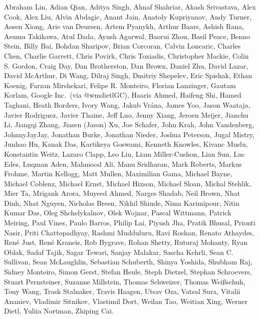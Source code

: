 Abraham Lin,
Adian Qian,
Aditya Singh,
Ahnaf Shahriar,
Akash Srivastava,
Alex Cook,
Alex Liu,
Alvin Abdagic,
Anant Jain,
Anatoly Kupriyanov,
Andy Turner,
Aosen Xiong,
Arie van Deursen,
Artem Pyanykh,
Arthur Baars,
Ashish Rana,
Asumu Takikawa,
Atul Dada,
Ayush Agarwal,
Baorui Zhou,
Basil Peace,
Benno Stein,
Billy Bai,
Bohdan Sharipov,
Brian Corcoran,
Calvin Loncaric,
Charles Chen,
Charlie Garrett,
Chris Povirk,
Chris Toxiadis,
Christopher Mackie,
Colin S. Gordon,
Craig Day,
Dan Brotherston,
Dan Brown,
Daniel Zhu,
David Lazar,
David McArthur,
Di Wang,
Dilraj Singh,
Dmitriy Shepelev,
Eric Spishak,
Ethan Koenig,
Farzan Mirshekari,
Felipe R. Monteiro,
Florian Lanzinger,
Gautam Korlam,
Google Inc.\ (via @wmdietlGC),
Haaris Ahmed,
Haifeng Shi,
Hamed Taghani,
Heath Borders,
Ivory Wang,
Jakub Vr\'ana,
James Yoo,
Jason Waataja,
Javier Rodriguez,
Javier Thaine,
Jeff Luo,
Jenny Xiang,
Jeroen Meijer,
Jianchu Li,
Jiangqi Zhang,
Jiasen (Jason) Xu,
Joe Schafer,
John Krah,
John Vandenberg,
JohnnyJayJay,
Jonathan Burke,
Jonathan Nieder,
Joshua Peterson,
Jugal Mistry,
Junhao Hu,
Kanak Das,
Kartikeya Goswami,
Kenneth Knowles,
Kivanc Muslu,
Konstantin Weitz,
Lazaro Clapp,
Leo Liu,
Liam Miller-Cushon,
Lian Sun,
Luc Edes,
Luqman Aden,
Mahmood Ali,
Manu Sridharan,
Mark Roberts,
Markus Frohme,
Martin Kellogg,
Matt Mullen,
Maximilian Gama,
Michael Bayne,
Michael Coblenz,
Michael Ernst,
Michael Hixson,
Michael Sloan,
Michal Stehlik,
Mier Ta,
Mrigank Arora,
Muyeed Ahmed,
Narges Shadab,
Neil Brown,
Nhat Dinh,
Nhat Nguyen,
Nicholas Breen,
Nikhil Shinde,
Nima Karimipour,
Nitin Kumar Das,
Oleg Shchelykalnov,
Olek Wojnar,
Pascal Wittmann,
Patrick Meiring,
Paul Vines,
Paulo Barros,
Philip Lai,
Piyush Jha,
Pratik Bhusal,
Prionti Nasir,
Priti Chattopadhyay,
Rashmi Mudduluru,
Ravi Roshan,
Renato Athaydes,
Ren\'e Just,
Ren\'e Kraneis,
Rob Bygrave,
Rohan Shetty,
Ruturaj Mohanty,
Ryan Oblak,
Sadaf Tajik,
Sagar Tewari,
Sanjay Malakar,
Sascha Kehrli,
Sean C. Sullivan,
Sean McLaughlin,
Sebastian Schuberth,
Shinya Yoshida,
Shubham Raj,
Sidney Monteiro,
Simon Gerst,
Stefan Heule,
Steph Dietzel,
Stephan Schroevers,
Stuart Pernsteiner,
Suzanne Millstein,
Thomas Schweizer,
Thomas Wei\ss schuh,
Tony Wang,
Trask Stalnaker,
Travis Haagen,
Utsav Oza,
Vatsal Sura,
Vitalii Ananiev,
Vladimir Sitnikov,
Vlastimil Dort,
Weilan Tao,
Weitian Xing,
Werner Dietl,
Yuliia Nortman,
Zhiping Cai.
